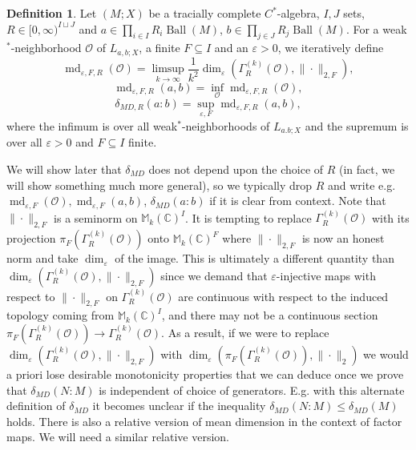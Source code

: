 \documentclass[10pt]{amsart}
\theoremstyle{definition}
\newtheorem{defn}[thm]{Definition}
\numberwithin{equation}{section}
\newcommand{\bC}{{\mathbb C}}
\newcommand{\bM}{{\mathbb M}}
\DeclareMathOperator{\Ball}{Ball}
\DeclareMathOperator{\md}{md}
\begin{document}
\begin{defn}
Let $(M;X)$ be a tracially complete $C^{*}$-algebra, $I,J$  sets, $R\in [0,\infty)^{I\sqcup J}$ and $a\in \prod_{i\in I}R_{i}\Ball(M)$, $b\in \prod_{j\in J}R_{j}\Ball(M)$. For a weak$^{*}$-neighborhood $\mathcal{O}$ of $L_{a,b;X}$, a finite $F\subseteq I$ and an $\varepsilon>0$, we iteratively define
\[\md_{\varepsilon,F,R}(\mathcal{O})=\limsup_{k\to\infty}\frac{1}{k^{2}}\dim_{\varepsilon}(\Gamma^{(k)}_{R}(\mathcal{O}),\|\cdot\|_{2,F}),\]
\[\md_{\varepsilon,F,R}(a,b)=\inf_{\mathcal{O}}\md_{\varepsilon,F,R}(\mathcal{O}),\]
\[\delta_{MD,R}(a:b)=\sup_{\varepsilon,F}\md_{\varepsilon,F,R}(a,b),\]
where the infimum is over all weak$^{*}$-neighborhoods of $L_{a.b;X}$ and the supremum is over all $\varepsilon>0$ and $F\subseteq I$ finite. 
\end{defn}
We will show later that $\delta_{MD}$ does not depend upon the choice of $R$ (in fact, we will show something much more general), so we typically drop $R$ and write e.g. $\md_{\varepsilon,F}(\mathcal{O}),\md_{\varepsilon,F}(a,b)$, $\delta_{MD}(a:b)$ if it is clear from context. 
Note that $\|\cdot\|_{2,F}$ is a seminorm on $\bM_{k}(\bC)^{I}$. It is tempting to replace $\Gamma^{(k)}_{R}(\mathcal{O})$ with its projection $\pi_{F}(\Gamma^{(k)}_{R}(\mathcal{O}))$ onto $\bM_{k}(\bC)^{F}$ where $\|\cdot\|_{2,F}$ is now an honest norm and take  $\dim_{\varepsilon}$ of the image. This is ultimately a different quantity than $\dim_{\varepsilon}(\Gamma^{(k)}_{R}(\mathcal{O}),\|\cdot\|_{2,F})$ since we demand that $\varepsilon$-injective maps with respect to $\|\cdot\|_{2,F}$ on $\Gamma^{(k)}_{R}(\mathcal{O})$ are continuous with respect to the induced topology coming from $\bM_{k}(\bC)^{I}$, and there may not be a continuous section $\pi_{F}(\Gamma^{(k)}_{R}(\mathcal{O}))\to \Gamma^{(k)}_{R}(\mathcal{O})$. As a result, if we were to replace $\dim_{\varepsilon}(\Gamma^{(k)}_{R}(\mathcal{O}),\|\cdot\|_{2,F})$ with $\dim_{\varepsilon}(\pi_{F}(\Gamma^{(k)}_{R}(\mathcal{O})),\|\cdot\|_{2})$ we would a priori lose desirable monotonicity properties that we can deduce once we prove that $\delta_{MD}(N:M)$ is independent of choice of generators. E.g. with this alternate definition of $\delta_{MD}$ it becomes unclear if the inequality $\delta_{MD}(N:M)\leq \delta_{MD}(M)$ holds.
There is also a relative version of mean dimension in the context of factor maps. We will need a similar relative version.
\end{document}
